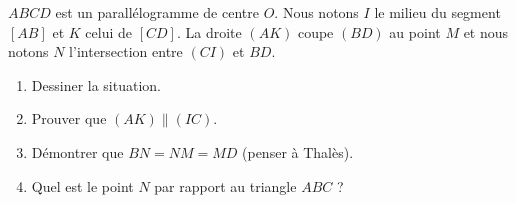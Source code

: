 
\begin{exercice}\label{exoSeconde-0098}

    \( ABCD\) est un parallélogramme de centre \( O\). Nous notons \( I\) le milieu du segment \( [AB]\) et \( K\) celui de \( [CD]\). La droite \( (AK)\) coupe \( (BD)\) au point \( M\) et nous notons \( N\) l'intersection entre \( (CI)\) et \( BD\).
    \begin{enumerate}
        \item
            Dessiner la situation.
        \item
            Prouver que \( (AK)\parallel (IC)\).
        \item
            Démontrer que \( BN=NM=MD\) (penser à Thalès).
        \item
            Quel est le point \( N\) par rapport au triangle \( ABC\) ?
    \end{enumerate}

\end{exercice}
